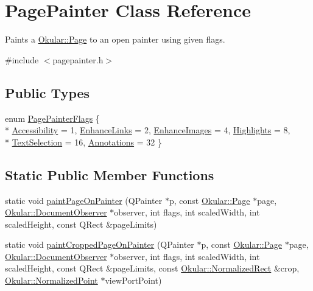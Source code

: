 \hypertarget{classPagePainter}{\section{Page\+Painter Class Reference}
\label{classPagePainter}
}


Paints a \hyperlink{classOkular_1_1Page}{Okular\+::\+Page} to an open painter using given flags.  




{\ttfamily \#include $<$pagepainter.\+h$>$}

\subsection*{Public Types}
\begin{DoxyCompactItemize}
\item 
enum \hyperlink{classPagePainter_ae7f51ac72a598d2753cfc35ecdb51e01}{Page\+Painter\+Flags} \{ \\*
\hyperlink{classPagePainter_ae7f51ac72a598d2753cfc35ecdb51e01ac3c6879723c19935fb6fe250d0feca17}{Accessibility} = 1, 
\hyperlink{classPagePainter_ae7f51ac72a598d2753cfc35ecdb51e01a388b8bc0e65542c5b36324ed9331b982}{Enhance\+Links} = 2, 
\hyperlink{classPagePainter_ae7f51ac72a598d2753cfc35ecdb51e01acbf8b61fc5bea59ff83332b5219a8ed2}{Enhance\+Images} = 4, 
\hyperlink{classPagePainter_ae7f51ac72a598d2753cfc35ecdb51e01a3582deaa27eb857b1bbdd54e6174b3b5}{Highlights} = 8, 
\\*
\hyperlink{classPagePainter_ae7f51ac72a598d2753cfc35ecdb51e01a76eae803a84abe4cdf3c21b73c2d266d}{Text\+Selection} = 16, 
\hyperlink{classPagePainter_ae7f51ac72a598d2753cfc35ecdb51e01a87c63f97188bb13cbafd5ae63be3fe40}{Annotations} = 32
 \}
\end{DoxyCompactItemize}
\subsection*{Static Public Member Functions}
\begin{DoxyCompactItemize}
\item 
static void \hyperlink{classPagePainter_a5eea3c770160bf6b62f36ef802b5bd25}{paint\+Page\+On\+Painter} (Q\+Painter $\ast$p, const \hyperlink{classOkular_1_1Page}{Okular\+::\+Page} $\ast$page, \hyperlink{classOkular_1_1DocumentObserver}{Okular\+::\+Document\+Observer} $\ast$observer, int flags, int scaled\+Width, int scaled\+Height, const Q\+Rect \&page\+Limits)
\item 
static void \hyperlink{classPagePainter_af6d636a41a9b1ebe8954c53bf5e3e6ec}{paint\+Cropped\+Page\+On\+Painter} (Q\+Painter $\ast$p, const \hyperlink{classOkular_1_1Page}{Okular\+::\+Page} $\ast$page, \hyperlink{classOkular_1_1DocumentObserver}{Okular\+::\+Document\+Observer} $\ast$observer, int flags, int scaled\+Width, int scaled\+Height, const Q\+Rect \&page\+Limits, const \hyperlink{classOkular_1_1NormalizedRect}{Okular\+::\+Normalized\+Rect} \&crop, \hyperlink{classOkular_1_1NormalizedPoint}{Okular\+::\+Normalized\+Point} $\ast$view\+Port\+Point)
\end{DoxyCompactItemize}



